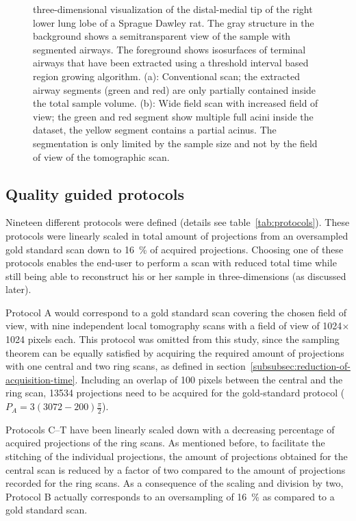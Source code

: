 \begin{figure}[htp]
{%
		}%
		\caption{three-dimensional visualization of the distal-medial tip of the right lower lung lobe of a Sprague Dawley rat. The gray structure in the background shows a semitransparent view of the sample with segmented airways. The foreground shows isosurfaces of terminal airways that have been extracted using a threshold interval based region growing algorithm. (a): Conventional scan; the extracted airway segments (green and red) are only partially contained inside the total sample volume. (b): Wide field scan with increased field of view; the green and red segment show multiple full acini inside the dataset, the yellow segment contains a partial acinus. The segmentation is only limited by the sample size and not by the field of view of the tomographic scan.}%
		\label{fig:s2-wfs}%
	\end{figure}
\fi

\subsection{Quality guided protocols}
\label{subsec:quality-guided-protocols}
Nineteen different protocols were defined (details see table~\ref{tab:protocols}). These protocols were linearly scaled in total amount of projections from an oversampled gold standard scan down to \SI{16}{\percent} of acquired projections. Choosing one of these protocols enables the end-user to perform a scan with reduced total time while still being able to reconstruct his or her sample in three-dimensions (as discussed later).

Protocol A would correspond to a gold standard scan covering the chosen field of view, with nine independent local tomography scans with a field of view of 1024$\times$1024 pixels each. This protocol was omitted from this study, since the sampling theorem can be equally satisfied by acquiring the required amount of projections with one central and two ring scans, as defined in section~\ref{subsubsec:reduction-of-acquisition-time}. Including an overlap of 100 pixels between the central and the ring scan, 13534 projections need to be acquired for the gold-standard protocol ($P_{A}=3(3072-200)\frac{\pi}{2}$).

Protocols C--T have been linearly scaled down with a decreasing percentage of acquired projections of the ring scans. As mentioned before, to facilitate the stitching of the individual projections, the amount of projections obtained for the central scan is reduced by a factor of two compared to the amount of projections recorded for the ring scans. As a consequence of the scaling and division by two, Protocol B actually corresponds to an oversampling of \SI{16}{\percent} as compared to a gold standard scan.

